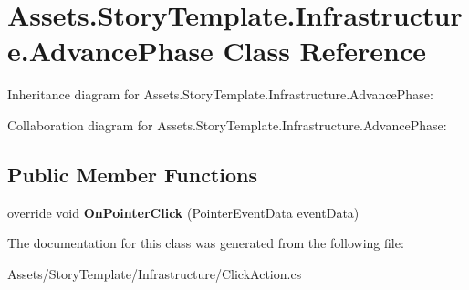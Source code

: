 \hypertarget{classAssets_1_1StoryTemplate_1_1Infrastructure_1_1AdvancePhase}{}\section{Assets.\+Story\+Template.\+Infrastructure.\+Advance\+Phase Class Reference}
\label{classAssets_1_1StoryTemplate_1_1Infrastructure_1_1AdvancePhase}


Inheritance diagram for Assets.\+Story\+Template.\+Infrastructure.\+Advance\+Phase\+:


Collaboration diagram for Assets.\+Story\+Template.\+Infrastructure.\+Advance\+Phase\+:
\subsection*{Public Member Functions}
\begin{DoxyCompactItemize}
\item 
override void {\bfseries On\+Pointer\+Click} (Pointer\+Event\+Data event\+Data)\hypertarget{classAssets_1_1StoryTemplate_1_1Infrastructure_1_1AdvancePhase_a259893426862459e98600bb2900051f9}{}\label{classAssets_1_1StoryTemplate_1_1Infrastructure_1_1AdvancePhase_a259893426862459e98600bb2900051f9}

\end{DoxyCompactItemize}


The documentation for this class was generated from the following file\+:\begin{DoxyCompactItemize}
\item 
Assets/\+Story\+Template/\+Infrastructure/Click\+Action.\+cs\end{DoxyCompactItemize}
